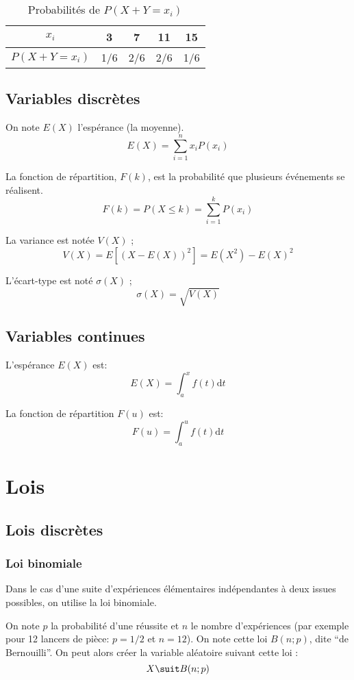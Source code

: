 \documentclass[10pt,a4paper,french]{article}
\begin{document}
\begin{table}[h]
\caption{\label{tab:var-alea-3} Probabilités de $P(X+Y = x_i)$}
\centering
\begin{tabular}{c|cccc}
$x_i$ & 3 & 7 & 11 & 15\\
\hline
$P(X+Y=x_i)$ & 1/6 & 2/6 & 2/6 & 1/6\\
\end{tabular}
\end{table}

\subsection{Variables discrètes}

On note $E(X)$ l'espérance (la moyenne).
\[
E(X) = \sum_{i=1}^n x_i P(x_i)
\]

La fonction de répartition, $F(k)$, est la probabilité que plusieurs événements se réalisent.
\[
F(k) = P(X \leq k) = \sum_{i=1}^k P(x_i)
\]

La variance est notée $V(X)$ ;
\[
V(X) = E[(X-E(X))^2] = E(X^2) - E(X)^2
\]

L'écart-type est noté $\sigma(X)$ ;
\[
\sigma(X) = \sqrt{V(X)}
\]

\subsection{Variables continues}

L'espérance $E(X)$ est:
\[
E(X)= \int_a^x f(t) \text{d} t
\]

La fonction de répartition $F(u)$ est:
\[
F(u) = \int_a^u f(t) \text{d} t
\]

\section{Lois}

\subsection{Lois discrètes}

\subsubsection{Loi binomiale}

Dans le cas d'une suite d'expériences élémentaires indépendantes à deux issues possibles, on utilise la loi binomiale.

On note $p$ la probabilité d'une réussite et $n$ le nombre d'expériences (par exemple pour 12 lancers de pièce: $p=1/2$ et $n=12$). On note cette loi $B(n; p)$, dite ``de Bernouilli''. On peut alors créer la variable aléatoire suivant cette loi : \[ X \suit B(n; p) \]
\end{document}
